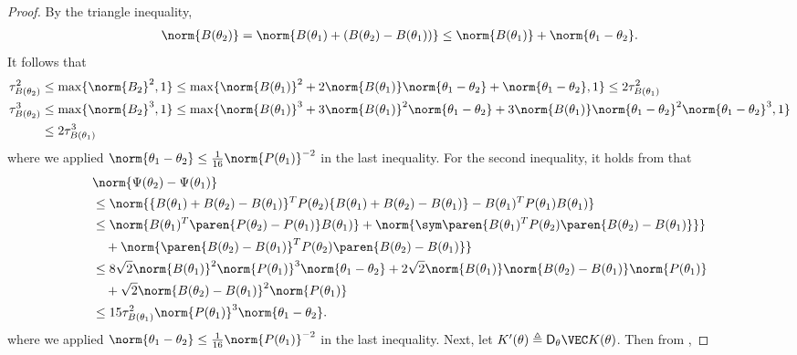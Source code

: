 \begin{proof}
    By the triangle inequality,
    \begin{align*}
        \norm{B(\theta_2)} = \norm{B(\theta_1) + (B(\theta_2) - B(\theta_1))} \leq \norm{B(\theta_1)} + \norm{\theta_1 - \theta_2}.
    \end{align*}
    It follows that
    \begin{align*}
        \tau^2_{B(\theta_2)} &\leq \max\{\norm{B_2}^2, 1\} \leq \max\{\norm{B(\theta_1)}^2+2\norm{B(\theta_1)}\norm{\theta_1-\theta_2} + \norm{\theta_1-\theta_2}, 1\} \leq 2\tau_{B(\theta_1)}^2 \\
        \tau^3_{B(\theta_2)} &\leq \max\{\norm{B_2}^3, 1\} \leq \max\{\norm{B(\theta_1)}^3+3\norm{B(\theta_1)}^2\norm{\theta_1-\theta_2} + 3\norm{B(\theta_1)}\norm{\theta_1-\theta_2}^2
        \norm{\theta_1-\theta_2}^3, 1\} \\
        &\leq 2\tau_{B(\theta_1)}^3
    \end{align*}
    where we applied $\norm{\theta_1-\theta_2} \leq \frac{1}{16}\norm{P(\theta_1)}^{-2}$ in the last inequality.
    For the second inequality, it holds from  that
    \begin{align*}
        &\norm{\Psi(\theta_2) - \Psi(\theta_1)} \\
        &\leq \norm{\{B(\theta_1) + B(\theta_2)-B(\theta_1)\}^TP(\theta_2)\{B(\theta_1) + B(\theta_2)-B(\theta_1)\} - B(\theta_1)^TP(\theta_1)B(\theta_1)} \\
        &\leq \norm{B(\theta_1)^T\paren{P(\theta_2)-P(\theta_1)}B(\theta_1)} + \norm{\sym\paren{B(\theta_1)^TP(\theta_2)\paren{B(\theta_2)-B(\theta_1)}}} \\
        &\quad+ \norm{\paren{B(\theta_2)-B(\theta_1)}^TP(\theta_2)\paren{B(\theta_2)-B(\theta_1)}} \\
        &\leq 8\sqrt{2}\norm{B(\theta_1)}^2\norm{P(\theta_1)}^3\norm{\theta_1-\theta_2} + 
        2\sqrt{2}\norm{B(\theta_1)}\norm{B(\theta_2)-B(\theta_1)}\norm{P(\theta_1)}  \\
        &\quad + \sqrt{2}\norm{B(\theta_2)-B(\theta_1)}^2\norm{P(\theta_1)} \\
        &\leq 15\tau^2_{B(\theta_1)}\norm{P(\theta_1)}^3\norm{\theta_1-\theta_2}.
    \end{align*}
    where we applied $\norm{\theta_1-\theta_2} \leq \frac{1}{16}\norm{P(\theta_1)}^{-2}$ in the last inequality. 
    Next, let $K'(\theta) \triangleq \mathsf{D}_{\theta}\VEC K(\theta)$. Then from , 

\end{proof}
